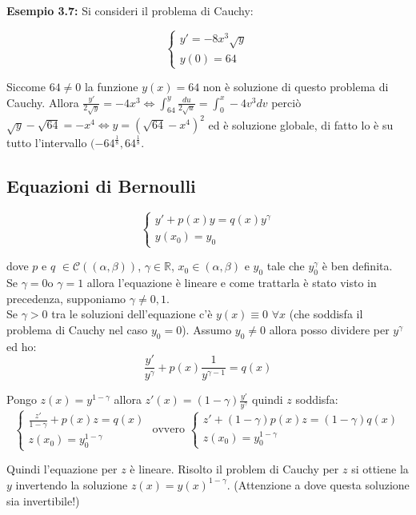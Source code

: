 \documentclass[a4paper,11pt,titlepage]{book}
\begin{document}
\textbf{Esempio 3.7:} Si consideri il problema di Cauchy:

$$\begin{cases}
y'=-8x^3\sqrt{y}\\
y(0)=64
\end{cases}$$

Siccome $64\ne 0$ la funzione $y(x)=64$ non è soluzione di questo problema di Cauchy. Allora $\frac{y'}{2\sqrt{y}}=-4x^3 \Leftrightarrow \int_{64}^y\frac{du}{2\sqrt{u}}=\int_0^x-4v^3dv$
perciò $\sqrt{y}-\sqrt{64}=-x^4 \Leftrightarrow y=(\sqrt{64}-x^4)^2$ ed è soluzione globale, di fatto lo è su tutto l'intervallo $(-64^{\frac{1}{8}},64^{\frac{1}{8}}$.\\

\subsection{Equazioni di Bernoulli}

$$\begin{cases}
y'+p(x)y=q(x)y^\gamma\\
y(x_0)=y_0
\end{cases}$$

dove $p$ e $q$ $\in\mathcal{C}((\alpha,\beta))$, $\gamma\in\mathbb{R}$, $x_0\in(\alpha,\beta)$ e $y_0$ tale che $y_0^\gamma$ è ben definita.\\

Se $\gamma=0$o $\gamma=1$ allora l'equazione è lineare e come trattarla è stato visto in precedenza, supponiamo $\gamma\ne 0,1$.\\

Se $\gamma >0$ tra le soluzioni dell'equazione c'è $y(x)\equiv0$ $\forall x$ (che soddisfa il problema di Cauchy nel caso $y_0=0$). Assumo $y_0\ne 0$ allora posso dividere per $y^\gamma$ ed ho: $$\frac{y'}{y^\gamma}+p(x)\frac{1}{y^{\gamma-1}}=q(x)$$

Pongo $z(x)=y^{1-\gamma}$ allora $z'(x)=(1-\gamma)\frac{y'}{y^\gamma}$ quindi $z$ soddisfa: $$\begin{cases} \frac{z'}{1-\gamma}+p(x)z=q(x)\\z(x_0)=y_0^{1-\gamma} \end{cases} \mbox{ ovvero } \begin{cases} z'+(1-\gamma)p(x)z=(1-\gamma)q(x)\\z(x_0)=y_0^{1-\gamma} \end{cases} $$

Quindi l'equazione per $z$ è lineare. Risolto il problem di Cauchy per $z$ si ottiene la $y$ invertendo la soluzione $z(x)=y(x)^{1-\gamma}$. (Attenzione a dove questa soluzione sia invertibile!)\\
\end{document}
